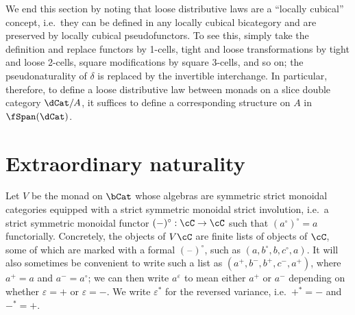 \documentclass{amsart}
\newcommand{\C}{\cC}
\newcommand{\dl}{\delta}
\newcommand{\blank}{\mathord{\hspace{1pt}\text{--}\hspace{1pt}}}
\renewcommand{\o}{^{\circ}}
\newcommand{\p}{^{+}}
\newcommand{\m}{^{-}}
\newcommand{\e}[1][]{^{\varepsilon_{#1}}}
\begin{document}
We end this section by noting that loose distributive laws are a ``locally cubical'' concept, i.e.\ they can be defined in any locally cubical bicategory and are preserved by locally cubical pseudofunctors.
To see this, simply take the definition and replace functors by 1-cells, tight and loose transformations by tight and loose 2-cells, square modifications by square 3-cells, and so on; the pseudonaturality of $\dl$ is replaced by the invertible interchange.
In particular, therefore, to define a loose distributive law between monads on a slice double category $\dCat/A$, it suffices to define a corresponding structure on $A$ in $\fSpan(\dCat)$.


\section{Extraordinary naturality}
\label{sec:extranat}

Let $V$ be the monad on $\bCat$ whose algebras are symmetric strict monoidal categories equipped with a strict symmetric monoidal strict involution, i.e.\ a strict symmetric monoidal functor $(-)\o : \C\to\C$ such that $(a\o)\o =a$ functorially.
Concretely, the objects of $V\C$ are finite lists of objects of $\C$, some of which are marked with a formal $(\blank)\o$, such as $(a,b\o,b,c\o,a)$.
It will also sometimes be convenient to write such a list as $(a\p,b\m,b\p,c\m,a\p)$, where $a\p=a$ and $a\m=a\o$; we can then write $a\e$ to mean either $a\p$ or $a\m$ depending on whether $\varepsilon=+$ or $\varepsilon=-$.
We write $\varepsilon^*$ for the reversed variance, i.e.\ $+^*=-$ and $-^*=+$.
\end{document}
